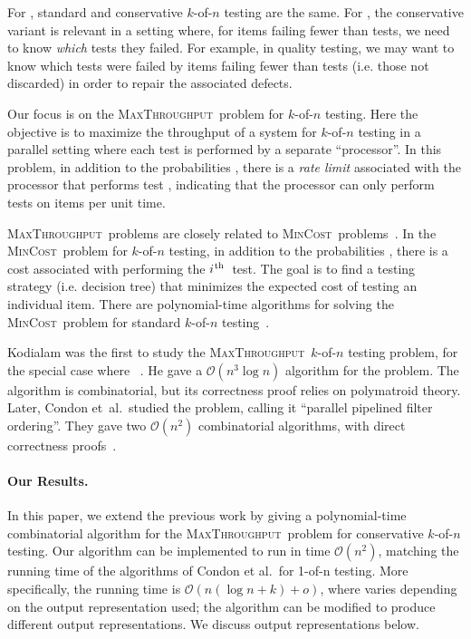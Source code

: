 \documentclass{article}
\newcounter{ass}
\newcommand{\ens}[1]{\ensuremath{#1}}					\newcommand{\card}[1]{\ens{|#1|}}							\newcommand{\dotlist}[2]{\ens{#1,\ldots,#2}}
\newcommand{\bigoh}[1]{\ens{\mathcal{O}(#1)}}				\newcommand{\bigom}[1]{\ens{\Omega(#1)}}
\newcommand{\ith}{\ens{i^{\mbox{\hspace{.2mm}\scriptsize th}}}}
\newcommand{\valn}{\ens{n}}
\newcommand{\valk}{\ens{k}}
\newcommand{\maxthru}{\textsc{MaxThroughput}}
\newcommand{\mincost}{\textsc{MinCost}}
\newcommand{\kofn}{\valk-of-\valn}
\newcommand{\processor}{processor}
\begin{document}
For , standard and conservative \kofn{} testing
are the same.
For , the conservative variant is relevant
in a setting where, for items failing fewer than  tests,
we need to know {\em which} tests they failed. 
For example, in quality testing, we may want to know which tests
were failed by items failing fewer than 
 tests (i.e. those not discarded)
in order to repair the associated defects.

Our focus is on the \maxthru\ problem 
for \kofn{} testing. 
Here the objective is to maximize the 
throughput of a system for \kofn{} testing in a parallel setting where each
test is performed by a separate ``{\processor}''.
In this problem, in addition to the probabilities , there
is a {\em rate limit}  associated with the {\processor} that performs
test , indicating that the
{\processor} can only perform tests on  items per unit time.

\maxthru\ problems are closely related to 
\mincost\ problems~\cite{conf/pods/LiuPRY08,DBLP:journals/talg/DeshpandeH12}.
In the \mincost\ problem for \kofn{} testing, 
in addition to the probabilities ,
there is a cost  associated with performing the \ith\ test.
The goal is to find a testing strategy (i.e.
decision tree) that minimizes the expected cost of testing an individual
item.    There are polynomial-time algorithms for solving the
\mincost\ problem for standard \kofn{} testing~\cite{salloumphd,salloumbreuer,bendov81,journals/tc/ChangSF90}.

Kodialam was the first to study the \maxthru\ \kofn{} 
testing problem, for the special case where ~\cite{conf/ipco/Kodialam01}.
He gave a \bigoh{n^3\log n} algorithm for the problem.  The algorithm is
combinatorial, but its correctness proof relies on
polymatroid theory.  
Later, Condon et~al.~studied the problem, calling it 
``parallel pipelined filter ordering''. 
They gave two \bigoh{n^2} combinatorial algorithms, 
with
direct correctness proofs~\cite{journals/talg/CondonDHW09}.

\paragraph{Our Results.} In this paper, we extend the previous work by giving a polynomial-time
combinatorial algorithm for the \maxthru\ problem for
conservative \kofn{} testing.
Our algorithm can be implemented to run in time 
\bigoh{n^2}, matching the running time of the algorithms of
Condon et al.~for 1-of-n testing.
More specifically, the running time
is \bigoh{\valn(\log \valn + \valk) + o}, where  varies depending on the
output representation used;
the algorithm can be modified to produce different output representations. We discuss output representations below. 
\end{document}
